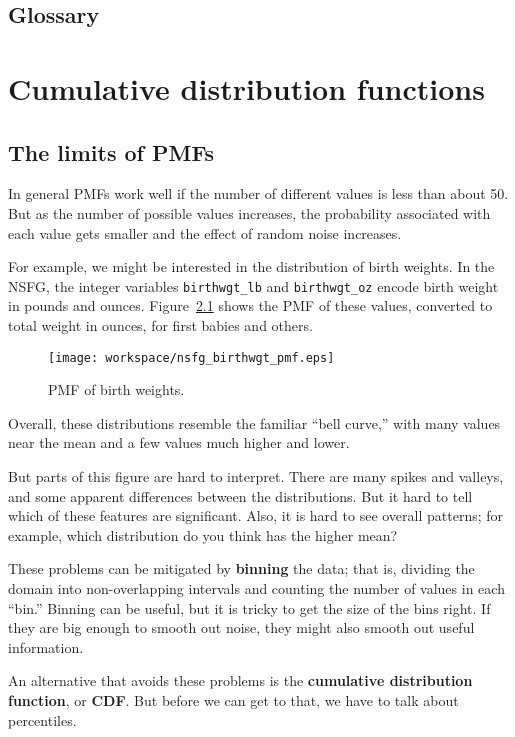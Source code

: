 \documentclass[10pt]{book}
\begin{document}
\section{Glossary}


\chapter{Cumulative distribution functions}

\section{The limits of PMFs}

In general PMFs work well if the number of different values is less than
about 50.  But as the number of possible values increases, the probability
associated with each value gets smaller and the effect of random noise
increases.

For example, we might be interested in the distribution of birth
weights.  In the NSFG, the integer variables \verb"birthwgt_lb" and
\verb"birthwgt_oz" encode birth weight in pounds and ounces.
Figure~\ref{nsfg_birthwgt_pmf} shows the PMF of these values,
converted to total weight in ounces, for first babies and others.

\begin{figure}
\centerline{\texttt{[image: workspace/nsfg\_birthwgt\_pmf.eps]}}
\caption{PMF of birth weights.}
\label{nsfg_birthwgt_pmf}
\end{figure}

Overall, these distributions resemble the familiar ``bell curve,'' with
many values near the mean and a few values much higher and lower.

But parts of this figure are hard to interpret.  There are many spikes
and valleys, and some apparent differences between the distributions.
But it hard to tell which of these features are significant.  Also, it
is hard to see overall patterns; for example, which distribution do
you think has the higher mean?

These problems can be mitigated by {\bf binning} the data;
that is, dividing the domain into non-overlapping intervals and counting
the number of values in each ``bin.''  Binning can be useful, but it is
tricky to get the size of the bins right.  If they are big enough to
smooth out noise, they might also smooth out useful information.

An alternative that avoids these problems is the {\bf cumulative
distribution function}, or {\bf CDF}.  But before we can get to that,
we have to talk about percentiles.
\end{document}
